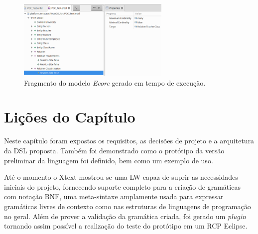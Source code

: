 \begin{figure} [!htb]
    \centering
    \caption{Fragmento do modelo \textit{Ecore} gerado em tempo de execução.}
    \label{fig:EcoreRealTime}
    \includegraphics[width=0.65\textwidth]{img/EcoreTempoReal.png}
\end{figure}


\section{Lições do Capítulo} \label{sec:licDSL}

Neste capítulo foram expostos os requisitos, as decisões de projeto e a arquitetura da \ac{DSL} proposta. 
Também foi demonstrado como o protótipo da versão preliminar da linguagem foi definido, bem como um exemplo de uso.

Até o momento o Xtext mostrou-se uma \ac{LW} capaz de suprir as necessidades iniciais do projeto, fornecendo suporte completo para a criação de gramáticas com notação \ac{BNF}, uma meta-sintaxe amplamente usada para expressar gramáticas livres de contexto como nas estruturas de linguagens de programação no geral. 
Além de prover a validação da gramática criada, foi gerado um \textit{plugin} tornando assim possível a realização do teste do protótipo em um \ac{RCP} Eclipse. 

